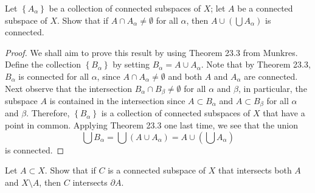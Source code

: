 \begin{problem}[Munkres \S23, Ex.\,3]
Let $\left\{A_\alpha\right\}$ be a collection of connected
subspaces of $X$; let $A$ be a connected subspace of $X$. Show
that if $A\cap A_\alpha\neq\emptyset$ for all $\alpha$, then
$A\cup\left(\bigcup A_\alpha\right)$ is connected.
\end{problem}
\begin{proof}
We shall aim to prove this result by using Theorem 23.3 from
Munkres. Define the collection $\left\{B_\alpha\right\}$ by
setting $B_\alpha=A\cup A_\alpha$. Note that by Theorem 23.3,
$B_\alpha$ is connected for all $\alpha$, since $A\cap
A_\alpha\neq\emptyset$ and both $A$ and $A_\alpha$ are
connected. Next observe that the intersection $B_\alpha\cap
B_\beta\neq\emptyset$ for all $\alpha$ and $\beta$, in
particular, the subspace $A$ is contained in the intersection
since $A\subset B_\alpha$ and $A\subset B_\beta$ for all $\alpha$
and $\beta$. Therefore, $\left\{B_\alpha\right\}$ is a collection
of connected subspaces of $X$ that have a point in
common. Applying Theorem 23.3 one last time, we see that the
union
\[
\bigcup B_\alpha
=
\bigcup\left(A\cup A_\alpha\right)
=
A\cup\left(\bigcup A_\alpha\right)
\]
is connected.
\end{proof}
\newpage
\begin{problem}[Munkres \S23, Ex.\,6]
Let $A\subset X$. Show that if $C$ is a connected subspace of $X$
that intersects both $A$ and $X\setminus A$, then $C$ intersects
$\partial A$.
\end{problem}
